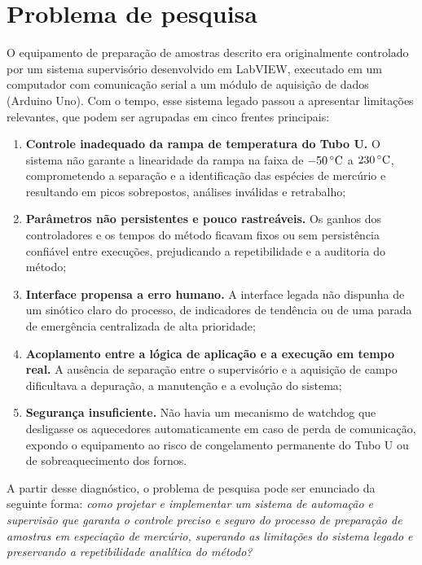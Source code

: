 \section{Problema de pesquisa}

O equipamento de preparação de amostras descrito era originalmente controlado
por um sistema supervisório desenvolvido em LabVIEW, executado em um computador
com comunicação serial a um módulo de aquisição de dados (Arduino Uno). Com o
tempo, esse sistema legado passou a apresentar limitações relevantes, que podem
ser agrupadas em cinco frentes principais:

\begin{enumerate}[label=\roman*)]
  \item \textbf{Controle inadequado da rampa de temperatura do Tubo U.} O
  sistema não garante a linearidade da rampa na faixa de $-50\,\celsius$ a
  $230\,\celsius$, comprometendo a separação e a identificação das espécies de
  mercúrio e resultando em picos sobrepostos, análises inválidas e retrabalho;
  \item \textbf{Parâmetros não persistentes e pouco rastreáveis.} Os ganhos dos
  controladores e os tempos do método ficavam fixos ou sem persistência
  confiável entre execuções, prejudicando a repetibilidade e a auditoria do
  método;
  \item \textbf{Interface propensa a erro humano.} A interface legada não
  dispunha de um sinótico claro do processo, de indicadores de tendência ou de
  uma parada de emergência centralizada de alta prioridade;
  \item \textbf{Acoplamento entre a lógica de aplicação e a execução em tempo
  real.} A ausência de separação entre o supervisório e a aquisição de campo
  dificultava a depuração, a manutenção e a evolução do sistema;
  \item \textbf{Segurança insuficiente.} Não havia um mecanismo de watchdog que
  desligasse os aquecedores automaticamente em caso de perda de comunicação,
  expondo o equipamento ao risco de congelamento permanente do Tubo U ou de
  sobreaquecimento dos fornos.
\end{enumerate}

A partir desse diagnóstico, o problema de pesquisa pode ser enunciado da
seguinte forma: \emph{como projetar e implementar um sistema de automação e
supervisão que garanta o controle preciso e seguro do processo de preparação de
amostras em especiação de mercúrio, superando as limitações do sistema legado e
preservando a repetibilidade analítica do método?}

